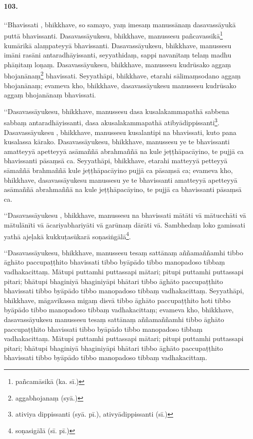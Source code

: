 \paragraph{103.} ‘‘Bhavissati , bhikkhave, so samayo, yaṃ imesaṃ manussānaṃ dasavassāyukā puttā bhavissanti. Dasavassāyukesu, bhikkhave, manussesu pañcavassikā\footnote{pañcamāsikā (ka. sī.)} kumārikā alaṃpateyyā bhavissanti. Dasavassāyukesu, bhikkhave, manussesu imāni rasāni antaradhāyissanti, seyyathidaṃ, sappi navanītaṃ telaṃ madhu phāṇitaṃ loṇaṃ. Dasavassāyukesu, bhikkhave, manussesu kudrūsako aggaṃ bhojanānaṃ\footnote{aggabhojanaṃ (syā.)} bhavissati. Seyyathāpi, bhikkhave, etarahi sālimaṃsodano aggaṃ bhojanānaṃ; evameva kho, bhikkhave, dasavassāyukesu manussesu kudrūsako aggaṃ bhojanānaṃ bhavissati.

‘‘Dasavassāyukesu, bhikkhave, manussesu dasa kusalakammapathā sabbena sabbaṃ antaradhāyissanti, dasa akusalakammapathā atibyādippissanti\footnote{ativiya dippissanti (syā. pī.), ativyādippissanti (sī.)}. Dasavassāyukesu , bhikkhave, manussesu kusalantipi na bhavissati, kuto pana kusalassa kārako. Dasavassāyukesu, bhikkhave, manussesu ye te bhavissanti amatteyyā apetteyyā asāmaññā abrahmaññā na kule jeṭṭhāpacāyino, te pujjā ca bhavissanti pāsaṃsā ca. Seyyathāpi, bhikkhave, etarahi matteyyā petteyyā sāmaññā brahmaññā kule jeṭṭhāpacāyino pujjā ca pāsaṃsā ca; evameva kho, bhikkhave, dasavassāyukesu manussesu ye te bhavissanti amatteyyā apetteyyā asāmaññā abrahmaññā na kule jeṭṭhāpacāyino, te pujjā ca bhavissanti pāsaṃsā ca.

‘‘Dasavassāyukesu , bhikkhave, manussesu na bhavissati mātāti vā mātucchāti vā mātulānīti vā ācariyabhariyāti vā garūnaṃ dārāti vā. Sambhedaṃ loko gamissati yathā ajeḷakā kukkuṭasūkarā soṇasiṅgālā\footnote{soṇasigālā (sī. pī.)}.

‘‘Dasavassāyukesu, bhikkhave, manussesu tesaṃ sattānaṃ aññamaññamhi tibbo āghāto paccupaṭṭhito bhavissati tibbo byāpādo tibbo manopadoso tibbaṃ vadhakacittaṃ. Mātupi puttamhi puttassapi mātari; pitupi puttamhi puttassapi pitari; bhātupi bhaginiyā bhaginiyāpi bhātari tibbo āghāto paccupaṭṭhito bhavissati tibbo byāpādo tibbo manopadoso tibbaṃ vadhakacittaṃ. Seyyathāpi, bhikkhave, māgavikassa migaṃ disvā tibbo āghāto paccupaṭṭhito hoti tibbo byāpādo tibbo manopadoso tibbaṃ vadhakacittaṃ; evameva kho, bhikkhave, dasavassāyukesu manussesu tesaṃ sattānaṃ aññamaññamhi tibbo āghāto paccupaṭṭhito bhavissati tibbo byāpādo tibbo manopadoso tibbaṃ vadhakacittaṃ. Mātupi puttamhi puttassapi mātari; pitupi puttamhi puttassapi pitari; bhātupi bhaginiyā bhaginiyāpi bhātari tibbo āghāto paccupaṭṭhito bhavissati tibbo byāpādo tibbo manopadoso tibbaṃ vadhakacittaṃ.

